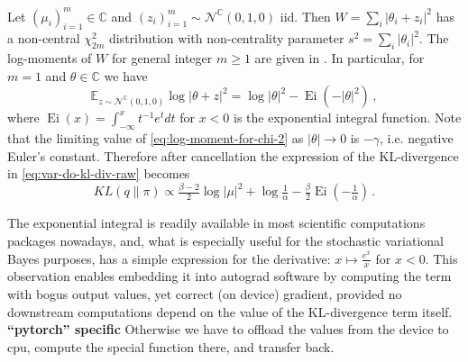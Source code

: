 \documentclass[a4paper,10pt]{article}
\newcommand{\important}[1]{\textbf{\color{red} #1}}
\newcommand{\cplx}{\mathbb{C}}
\begin{document}
Let $(\mu_i)_{i=1}^m \in \cplx$ and $
  (z_i)_{i=1}^m \sim \mathcal{N}^{\cplx}(0, 1, 0)
$ iid. Then $W = \sum_i \lvert \theta_i + z_i \rvert^2$ has a non-central $\chi^2_{2m}$
distribution with non-centrality parameter $s^2 = \sum_i \lvert \theta_i \rvert^2$. The
log-moments of $W$ for general integer $m \geq1$ are given in
\cite[p.~2248]{lapidoth_capacity_2003}.  %
In particular, for $m=1$ and $\theta\in \cplx$ we have
\begin{equation}  \label{eq:log-moment-for-chi-2}
\mathbb{E}_{z \sim \mathcal{N}^{\cplx}(0, 1, 0)}
  \log \lvert \theta + z \rvert^2
  = \log \lvert \theta \rvert^2 - \mathop{Ei}( - \lvert \theta \rvert^2)
  \,,
\end{equation}
where $\mathop{Ei}(x) = \int^x_{-\infty} t^{-1} e^t dt$ for $x < 0$ is the exponential integral
function. Note that the limiting value of \eqref{eq:log-moment-for-chi-2} as $
  \lvert \theta \rvert \to 0
$ is $- \gamma$, i.e. negative Euler's constant. Therefore after cancellation the expression
of the KL-divergence in \eqref{eq:var-do-kl-div-raw} becomes
\begin{equation}  \label{eq:var-do-kl-div}
KL(q\| \pi)
  \propto
    \tfrac{\beta-2}2 \log{\lvert \mu \rvert^2}
    + \log{\tfrac1{\alpha}}
    - \tfrac{\beta}2 \mathop{Ei}(- \tfrac1{\alpha})
  \,.
\end{equation}

The exponential integral is readily available in most scientific computations packages nowadays,
and, what is especially useful for the stochastic variational Bayes purposes, has a simple
expression for the derivative: $x \mapsto \tfrac{e^x}{x}$ for $x < 0$. This observation enables
embedding it into autograd software by computing the term with bogus output values, yet correct
(on device) gradient, provided no downstream computations depend on the value of the KL-divergence
term itself.
%
\important{``pytorch'' specific}
Otherwise we have to offload the values from the device to cpu, compute the special
function there, and transfer back.
\end{document}
